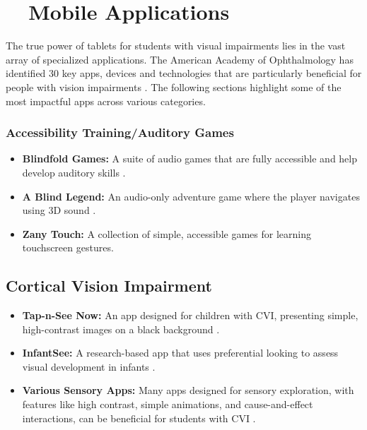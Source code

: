 \section{~~Mobile Applications}\label{ch2:sec:mobile-apps}
The true power of tablets for students with visual impairments lies in the vast array of specialized applications. The American Academy of Ophthalmology has identified 30 key apps, devices and technologies that are particularly beneficial for people with vision impairments \supercite{AAOApps}. The following sections highlight some of the most impactful apps across various categories.

\subsubsection{Accessibility Training/Auditory Games}\label{ch2:sssec:games}
\begin{itemize}
	\item \textbf{Blindfold Games:} A suite of audio games that are fully accessible and help develop auditory skills \supercite{BlindfoldGames}.
	\item \textbf{A Blind Legend:} An audio-only adventure game where the player navigates using 3D sound \supercite{ABlindLegend}.
	\item \textbf{Zany Touch:} A collection of simple, accessible games for learning touchscreen gestures.\supercite{TapNSeeNow}
\end{itemize}

\subsection{Cortical Vision Impairment}\label{ch2:ssec:cvi-apps}
\begin{itemize}
	\item \textbf{Tap-n-See Now:} An app designed for children with CVI, presenting simple, high-contrast images on a black background \supercite{TapNSeeNow}.
	\item \textbf{InfantSee:} A research-based app that uses preferential looking to assess visual development in infants \supercite{InfantSee}.
	\item \textbf{Various Sensory Apps:} Many apps designed for sensory exploration, with features like high contrast, simple animations, and cause-and-effect interactions, can be beneficial for students with CVI \supercite{SensoryApps}.
\end{itemize}

